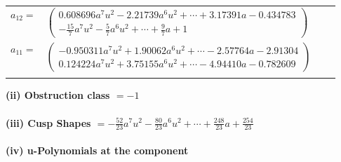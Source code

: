 \documentclass[1p]{elsarticle_modified}
\theoremstyle{definition}
\begin{document}
\begin{tabular}{m{7pt} m{180pt} m{7pt} m{180pt} }
\flushright $a_{12}=$&$\begin{pmatrix}0.608696 a^{7} u^{2}-2.21739 a^{6} u^{2}+\cdots+3.17391 a-0.434783\\-\frac{15}{7} a^7 u^2-\frac{5}{7} a^6 u^2+\cdots+\frac{9}{7} a+1\end{pmatrix}$ \\
\flushright $a_{11}=$&$\begin{pmatrix}-0.950311 a^{7} u^{2}+1.90062 a^{6} u^{2}+\cdots-2.57764 a-2.91304\\0.124224 a^{7} u^{2}+3.75155 a^{6} u^{2}+\cdots-4.94410 a-0.782609\end{pmatrix}$\\&\end{tabular}
\flushleft \textbf{(ii) Obstruction class $= -1$}\\~\\
\flushleft \textbf{(iii) Cusp Shapes $= -\frac{52}{23} a^7 u^2-\frac{80}{23} a^6 u^2+\cdots+\frac{248}{23} a+\frac{254}{23}$}\\~\\
\newpage\renewcommand{\arraystretch}{1}
\flushleft \textbf{(iv) u-Polynomials at the component}\newline \\
\end{document}
